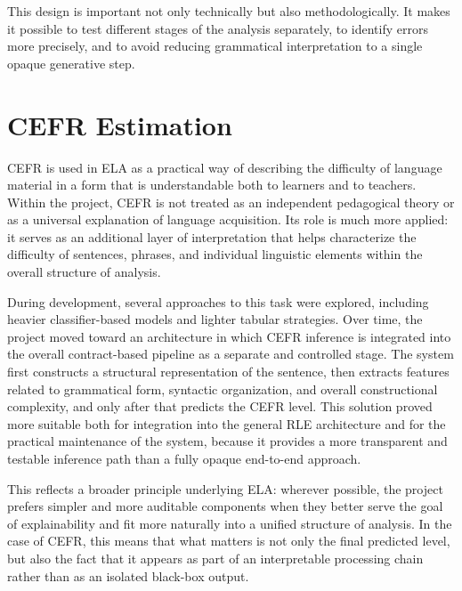 \documentclass[12pt,a4paper,oneside]{report}
\begin{document}
This design is important not only technically but also methodologically. It makes it possible to test different stages of the analysis separately, to identify errors more precisely, and to avoid reducing grammatical interpretation to a single opaque generative step.

\section{CEFR Estimation}
CEFR is used in ELA as a practical way of describing the difficulty of language material in a form that is understandable both to learners and to teachers. Within the project, CEFR is not treated as an independent pedagogical theory or as a universal explanation of language acquisition. Its role is much more applied: it serves as an additional layer of interpretation that helps characterize the difficulty of sentences, phrases, and individual linguistic elements within the overall structure of analysis.

During development, several approaches to this task were explored, including heavier classifier-based models and lighter tabular strategies. Over time, the project moved toward an architecture in which CEFR inference is integrated into the overall contract-based pipeline as a separate and controlled stage. The system first constructs a structural representation of the sentence, then extracts features related to grammatical form, syntactic organization, and overall constructional complexity, and only after that predicts the CEFR level. This solution proved more suitable both for integration into the general RLE architecture and for the practical maintenance of the system, because it provides a more transparent and testable inference path than a fully opaque end-to-end approach.

This reflects a broader principle underlying ELA: wherever possible, the project prefers simpler and more auditable components when they better serve the goal of explainability and fit more naturally into a unified structure of analysis. In the case of CEFR, this means that what matters is not only the final predicted level, but also the fact that it appears as part of an interpretable processing chain rather than as an isolated black-box output.
\end{document}
